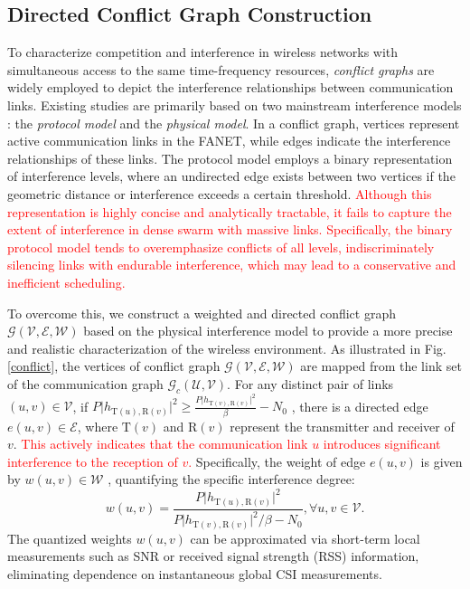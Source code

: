 \documentclass[journal]{IEEEtran}
\begin{document}
	\subsection{Directed Conflict Graph Construction}
	To characterize competition and interference in wireless networks with simultaneous access to the same time-frequency resources, \textit{conflict graphs} are widely employed to depict the interference relationships between communication links. Existing studies are primarily based on two mainstream interference models \cite{guptaCapacity2000, ImpactInterference}: the \textit{protocol model} and the \textit{physical model}. 
	In a conflict graph, vertices represent active communication links in the FANET, while edges indicate the interference relationships of these links. The protocol model employs a binary representation of interference levels, where an undirected edge exists between two vertices if the geometric distance or interference exceeds a certain threshold. \textcolor{red}{Although this representation is highly concise and analytically tractable, it fails to capture the extent of interference in dense swarm with massive links. Specifically, the binary protocol model tends to overemphasize conflicts of all levels, indiscriminately silencing links with endurable interference, which may lead to a conservative and inefficient scheduling.}
	
	To overcome this, we construct a weighted and directed conflict graph $\mathcal{G}(\mathcal {V},\mathcal{E},\mathcal{W})$ based on the physical interference model to provide a more precise and realistic characterization of the wireless environment. As illustrated in Fig. \ref{conflict}, the vertices of conflict graph $\mathcal{G}(\mathcal {V},\mathcal{E},\mathcal{W})$ are mapped from the link set of the communication graph $\mathcal{G}_c(\mathcal{U}, \mathcal{V})$. For any distinct pair of links $(u, v) \in \mathcal{V}$, if $P\vert h_{\mathrm{T}(u),\mathrm{R}(v)}\vert^2\geq \frac{P\vert h_{\mathrm{T}(v),\mathrm{R}(v)}\vert^2}{\beta}-N_0$ \cite{ImpactInterference}, there is a directed edge $e(u,v)\in \mathcal{E}$, where $\mathrm{T}(v)$ and $\mathrm{R}(v)$ represent the transmitter and receiver of $v$. \textcolor{red}{This actively indicates that the communication link $u$ introduces significant interference to the reception of $v$.} Specifically, the weight of edge $e(u,v)$ is given by $w(u,v)\in \mathcal{W}$ \cite{ImpactInterference}, quantifying the specific interference degree:
	\begin{equation}
		w(u,v)= \frac{P\vert h_{\mathrm{T}(u),\mathrm{R}(v)}\vert^2}{P\vert h_{\mathrm{T}(v),\mathrm{R}(v)}\vert^2 / \beta-N_0}, \forall u,v\in\mathcal{V}.\label{eq:edgeweight}
	\end{equation}
	The quantized weights $w(u,v)$ can be approximated via short-term local measurements such as SNR or received signal strength (RSS) information, eliminating dependence on instantaneous global CSI measurements.
	
\end{document}
